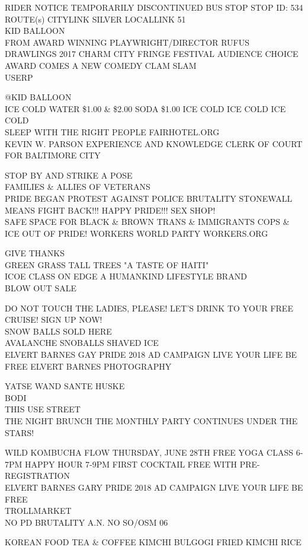 \documentclass[10pt,letterpaper]{article}
\begin{document}
RIDER NOTICE TEMPORARILY DISCONTINUED BUS STOP STOP ID: 534 ROUTE(s) CITYLINK SILVER LOCALLINK 51\\
KID BALLOON\\
FROM AWARD WINNING PLAYWRIGHT/DIRECTOR RUFUS DRAWLINGS 2017 CHARM CITY FRINGE FESTIVAL AUDIENCE CHOICE AWARD COMES A NEW COMEDY CLAM SLAM\\
USERP

@KID BALLOON\\
ICE COLD WATER \$1.00 \& \$2.00 SODA \$1.00 ICE COLD ICE COLD ICE COLD\\
SLEEP WITH THE RIGHT PEOPLE FAIRHOTEL.ORG\\
KEVIN W. PARSON EXPERIENCE AND KNOWLEDGE CLERK OF COURT FOR BALTIMORE CITY

STOP BY AND STRIKE A POSE\\
FAMILIES \& ALLIES OF VETERANS\\
PRIDE BEGAN PROTEST AGAINST POLICE BRUTALITY STONEWALL MEANS FIGHT BACK!!! HAPPY PRIDE!!! SEX SHOP!\\
SAFE SPACE FOR BLACK \& BROWN TRANS \& IMMIGRANTS COPS \& ICE OUT OF PRIDE!  WORKERS WORLD PARTY WORKERS.ORG

GIVE THANKS\\
GREEN GRASS TALL TREES "A TASTE OF HAITI"\\
ICOE CLASS ON EDGE A HUMANKIND LIFESTYLE BRAND\\
BLOW OUT SALE

DO NOT TOUCH THE LADIES, PLEASE!  LET'S DRINK TO YOUR FREE CRUISE!  SIGN UP NOW!\\
SNOW BALLS SOLD HERE\\
AVALANCHE SNOBALLS SHAVED ICE\\
ELVERT BARNES GAY PRIDE 2018 AD CAMPAIGN LIVE YOUR LIFE BE FREE ELVERT BARNES PHOTOGRAPHY

YATSE WAND SANTE HUSKE\\
BODI\\
THIS USE STREET\\
THE NIGHT BRUNCH THE MONTHLY PARTY CONTINUES UNDER THE STARS!

WILD KOMBUCHA FLOW THURSDAY, JUNE 28TH FREE YOGA CLASS 6{-}7PM HAPPY HOUR 7{-}9PM FIRST COCKTAIL FREE WITH PRE{-}REGISTRATION\\
ELVERT BARNES GARY PRIDE 2018 AD CAMPAIGN LIVE YOUR LIFE BE FREE\\
TROLLMARKET\\
NO PD BRUTALITY A.N. NO SO/OSM 06

KOREAN FOOD TEA \& COFFEE KIMCHI BULGOGI FRIED KIMCHI RICE
\end{document}
